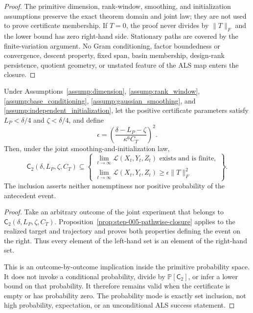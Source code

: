 \begin{proof}
The primitive dimension, rank-window, smoothing, and initialization
assumptions preserve the exact theorem domain and joint law; they are not
used to prove certificate membership.  If $T=0$, the proof never divides by
$\|T\|_F$ and the lower bound has zero right-hand side.  Stationary paths are
covered by the finite-variation argument.  No Gram conditioning, factor
boundedness or convergence, descent property, fixed span, basin membership,
design-rank persistence, quotient geometry, or unstated feature of the ALS
map enters the closure.
\end{proof}

\begin{proposition}
\label{prop:step-005-event-inclusion}
Under Assumptions~\ref{assump:dimension}, \ref{assump:rank_window},
\ref{assump:base_conditioning}, \ref{assump:gaussian_smoothing}, and
\ref{assump:independent_initialization}, let the positive certificate
parameters satisfy $L_P<\delta/4$ and $\zeta<\delta/4$, and define
\[
\epsilon=
\left(\frac{\delta-L_P-\zeta}{\kappa^6C_T}\right)^2.
\]
Then, under the joint smoothing-and-initialization law,
\[
\mathsf C_2(\delta,L_P,\zeta,C_T)
\subseteq
\left\{
\begin{array}{l}
\displaystyle\lim_{t\to\infty}\mathcal L(X_t,Y_t,Z_t)
\text{ exists and is finite},\\[2mm]
\displaystyle\lim_{t\to\infty}\mathcal L(X_t,Y_t,Z_t)
\geq\epsilon\|T\|_F^2
\end{array}
\right\}.
\]
The inclusion asserts neither nonemptiness nor positive probability of the
antecedent event.
\end{proposition}

\begin{proof}
Take an arbitrary outcome of the joint experiment that belongs to
$\mathsf C_2(\delta,L_P,\zeta,C_T)$.  Proposition~\ref{prop:step-005-pathwise-closure}
applies to the realized target and trajectory and proves both properties
defining the event on the right.  Thus every element of the left-hand set is
an element of the right-hand set.

This is an outcome-by-outcome implication inside the primitive probability
space.  It does not invoke a conditional probability, divide by
$\mathbb P[\mathsf C_2]$, or infer a lower bound on that probability.  It
therefore remains valid when the certificate is empty or has probability
zero.  The probability mode is exactly set inclusion, not high probability,
expectation, or an unconditional ALS success statement.
\end{proof}

